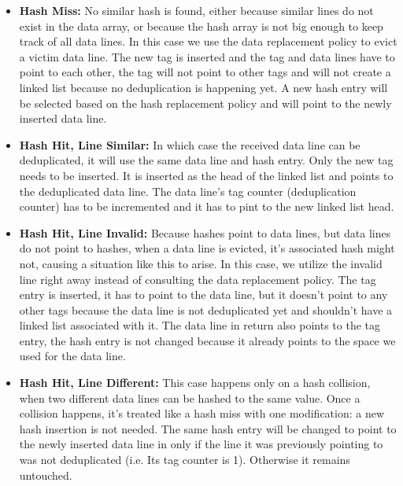 \begin{itemize}
    \item \textbf{Hash Miss:} No similar hash is found, either because similar lines do not exist in the data array, or because the hash array is not big enough to keep track of all data lines. In this case we use the data replacement policy to evict a victim data line. The new tag is inserted and the tag and data lines have to point to each other, the tag will not point to other tags and will not create a linked list because no deduplication is happening yet. A new hash entry will be selected based on the hash replacement policy and will point to the newly inserted data line.
    \item \textbf{Hash Hit, Line Similar:} In which case the received data line can be deduplicated, it will use the same data line and hash entry. Only the new tag needs to be inserted. It is inserted as the head of the linked list and points to the deduplicated data line. The data line's tag counter (deduplication counter) has to be incremented and it has to pint to the new linked list head.
    \item \textbf{Hash Hit, Line Invalid:} Because hashes point to data lines, but data lines do not point to hashes, when a data line is evicted, it's associated hash might not, causing a situation like this to arise. In this case, we utilize the invalid line right away instead of consulting the data replacement policy. The tag entry is inserted, it has to point to the data line, but it doesn't point to any other tags because the data line is not deduplicated yet and shouldn't have a linked list associated with it. The data line in return also points to the tag entry, the hash entry is not changed because it already points to the space we used for the data line.
    \item \textbf{Hash Hit, Line Different:} This case happens only on a hash collision, when two different data lines can be hashed to the same value. Once a collision happens, it's treated like a hash miss with one modification: a new hash insertion is not needed. The same hash entry will be changed to point to the newly inserted data line in only if the line it was previously pointing to was not deduplicated (i.e. Its tag counter is 1). Otherwise it remains untouched.
\end{itemize}

